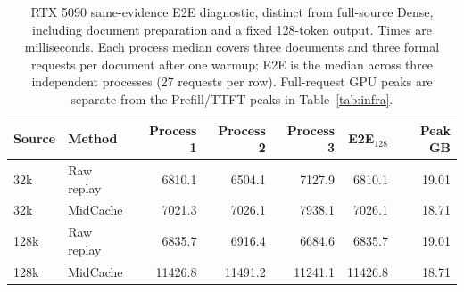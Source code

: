 \begin{table}[htbp]
\centering
\small
\setlength{\tabcolsep}{4pt}
\begin{tabular}{@{}llrrrrr@{}}
\toprule
Source & Method & Process 1 & Process 2 & Process 3 & E2E$_{128}$ & Peak GB\\
\midrule
32k & Raw replay & 6810.1 & 6504.1 & 7127.9 & 6810.1 & 19.01\\
32k & MidCache & 7021.3 & 7026.1 & 7938.1 & 7026.1 & 18.71\\
128k & Raw replay & 6835.7 & 6916.4 & 6684.6 & 6835.7 & 19.01\\
128k & MidCache & 11426.8 & 11491.2 & 11241.1 & 11426.8 & 18.71\\
\bottomrule
\end{tabular}
\caption{RTX 5090 same-evidence E2E diagnostic, distinct from full-source Dense, including document preparation and a fixed 128-token output. Times are milliseconds. Each process median covers three documents and three formal requests per document after one warmup; E2E is the median across three independent processes (27 requests per row). Full-request GPU peaks are separate from the Prefill/TTFT peaks in Table~\ref{tab:infra}.}
\label{tab:local-e2e}
\end{table}
